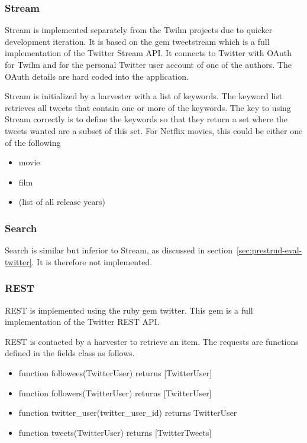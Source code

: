 \subsubsection{Stream}
Stream is implemented separately from the Twilm projects due to quicker development iteration. It is based on the gem tweetstream which is a full implementation of the Twitter Stream API. It connects to Twitter with OAuth for Twilm and for the personal Twitter user account of one of the authors. The OAuth details are hard coded into the application.

Stream is initialized by a harvester with a list of keywords. The keyword list retrieves all tweets that contain one or more of the keywords. The key to using Stream correctly is to define the keywords so that they return a set where the tweets wanted are a subset of this set. For Netflix movies, this could be either one of the following

	\begin{itemize}
	\item movie
	\item film
	\item (list of all release years)
	\end{itemize}

\subsubsection{Search}
Search is similar but inferior to Stream, as discussed in section~\ref{sec:prestrud-eval-twitter}. It is therefore not implemented.

\subsubsection{REST}
REST is implemented using the ruby gem twitter. This gem is a full implementation of the Twitter REST API.

REST is contacted by a harvester to retrieve an item. The requests are functions defined in the fields class as follows.

	\begin{itemize}
	\item function followees(TwitterUser) returns [TwitterUser]
	\item function followers(TwitterUser) returns [TwitterUser]
	\item function twitter\_user(twitter\_user\_id) returns TwitterUser
	\item function tweets(TwitterUser) returns [TwitterTweets]
	\end{itemize}

